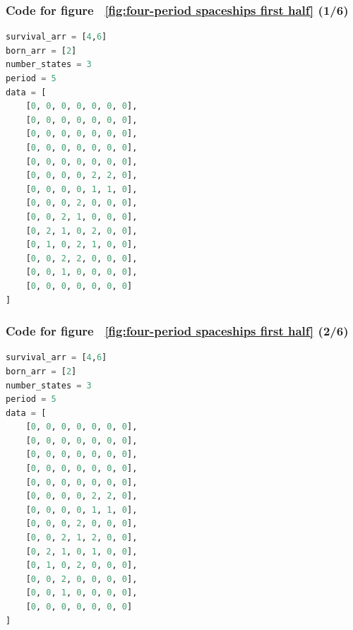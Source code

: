 \documentclass[12pt]{article}
\numberwithin{figure}{section} %
\begin{document}
\noindent\begin{minipage}{.45\textwidth}
\subsubsection{Code for figure ~\ref{fig:four-period spaceships first half} (1/6)}
\label{subsubsection:four-period spaceships(1/6)}
\begin{lstlisting}[language = Python]
survival_arr = [4,6]
born_arr = [2]
number_states = 3
period = 5
data = [
    [0, 0, 0, 0, 0, 0, 0],
    [0, 0, 0, 0, 0, 0, 0],
    [0, 0, 0, 0, 0, 0, 0],
    [0, 0, 0, 0, 0, 0, 0],
    [0, 0, 0, 0, 0, 0, 0],
    [0, 0, 0, 0, 2, 2, 0],
    [0, 0, 0, 0, 1, 1, 0],
    [0, 0, 0, 2, 0, 0, 0],
    [0, 0, 2, 1, 0, 0, 0],
    [0, 2, 1, 0, 2, 0, 0],
    [0, 1, 0, 2, 1, 0, 0],
    [0, 0, 2, 2, 0, 0, 0],
    [0, 0, 1, 0, 0, 0, 0],
    [0, 0, 0, 0, 0, 0, 0]
]

\end{lstlisting}
\end{minipage}\hfill
\begin{minipage}{.45\textwidth}
\subsubsection{Code for figure ~\ref{fig:four-period spaceships first half} (2/6)}
\label{subsubsection:four-period spaceships(2/6)}
\begin{lstlisting}[language = Python]
survival_arr = [4,6]
born_arr = [2]
number_states = 3
period = 5
data = [
    [0, 0, 0, 0, 0, 0, 0],
    [0, 0, 0, 0, 0, 0, 0],
    [0, 0, 0, 0, 0, 0, 0],
    [0, 0, 0, 0, 0, 0, 0],
    [0, 0, 0, 0, 0, 0, 0],
    [0, 0, 0, 0, 2, 2, 0],
    [0, 0, 0, 0, 1, 1, 0],
    [0, 0, 0, 2, 0, 0, 0],
    [0, 0, 2, 1, 2, 0, 0],
    [0, 2, 1, 0, 1, 0, 0],
    [0, 1, 0, 2, 0, 0, 0],
    [0, 0, 2, 0, 0, 0, 0],
    [0, 0, 1, 0, 0, 0, 0],
    [0, 0, 0, 0, 0, 0, 0]
]
\end{lstlisting}
\end{minipage}
\end{document}
